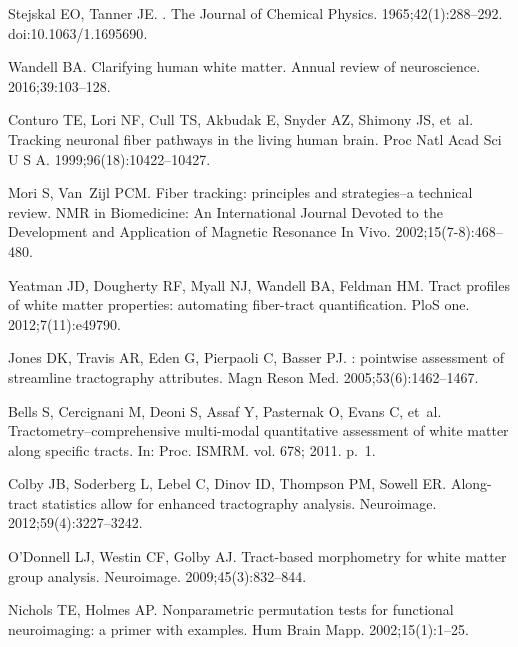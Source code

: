 \documentclass[10pt,letterpaper]{article}
\begin{document}
\begin{thebibliography}{100}

Stejskal EO, Tanner JE.
.
\newblock The Journal of Chemical Physics. 1965;42(1):288--292.
\newblock doi:{10.1063/1.1695690}.

Wandell BA.
\newblock Clarifying human white matter.
\newblock Annual review of neuroscience. 2016;39:103--128.

Conturo TE, Lori NF, Cull TS, Akbudak E, Snyder AZ, Shimony JS, et~al.
\newblock Tracking neuronal fiber pathways in the living human brain.
\newblock Proc Natl Acad Sci U S A. 1999;96(18):10422--10427.

Mori S, Van~Zijl PCM.
\newblock Fiber tracking: principles and strategies--a technical review.
\newblock NMR in Biomedicine: An International Journal Devoted to the
  Development and Application of Magnetic Resonance In Vivo.
  2002;15(7-8):468--480.

Yeatman JD, Dougherty RF, Myall NJ, Wandell BA, Feldman HM.
\newblock Tract profiles of white matter properties: automating fiber-tract
  quantification.
\newblock PloS one. 2012;7(11):e49790.

Jones DK, Travis AR, Eden G, Pierpaoli C, Basser PJ.
: pointwise assessment of streamline tractography attributes.
\newblock Magn Reson Med. 2005;53(6):1462--1467.

Bells S, Cercignani M, Deoni S, Assaf Y, Pasternak O, Evans C, et~al.
\newblock Tractometry--comprehensive multi-modal quantitative assessment of
  white matter along specific tracts.
\newblock In: Proc. ISMRM. vol. 678; 2011. p.~1.

Colby JB, Soderberg L, Lebel C, Dinov ID, Thompson PM, Sowell ER.
\newblock Along-tract statistics allow for enhanced tractography analysis.
\newblock Neuroimage. 2012;59(4):3227--3242.

O'Donnell LJ, Westin CF, Golby AJ.
\newblock Tract-based morphometry for white matter group analysis.
\newblock Neuroimage. 2009;45(3):832--844.

Nichols TE, Holmes AP.
\newblock Nonparametric permutation tests for functional neuroimaging: a primer
  with examples.
\newblock Hum Brain Mapp. 2002;15(1):1--25.


\end{thebibliography}
\end{document}
